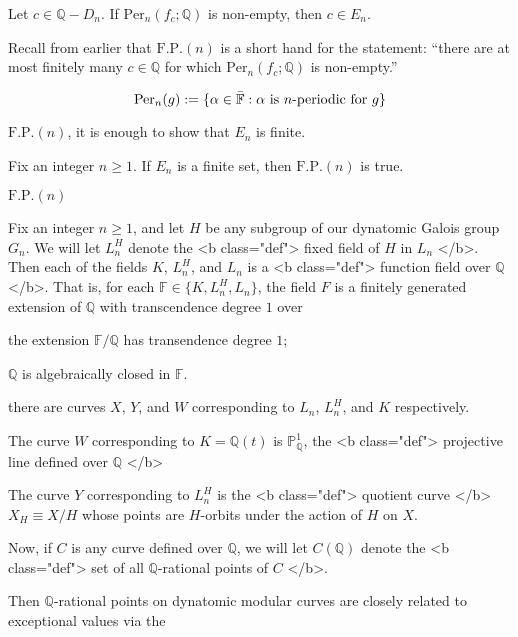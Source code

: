Let \( c \in \mathbb{Q} -D_n \). If \( \mathrm{Per}_{ n } (f_c; \mathbb{ Q } )   \) is non-empty, then \( c \in E_n \). 

Recall from earlier that \(  \mathrm{F.P.}(n)   \) is a short hand for the statement: ``there are at most finitely many \( c \in \mathbb{Q}  \)  for which \( \mathrm{Per}_{ n } (f_c; \mathbb{ Q } )   \) is non-empty.'' 

\[ 
    \mathrm{Per}_{ n } (g) := \{ \alpha \in \bar{\mathbb{F}}  : \text{\( \alpha \) is \( n \)-periodic for \( g \)} \}   
\]

\(  \mathrm{F.P.}(n)   \), it is enough to show that \( E_n \) is finite.

Fix an integer \( n \ge 1 \). If \( E_n \) is a finite set, then \(  \mathrm{F.P.}(n)   \) is true.  

\(  \mathrm{F.P.}(n)   \) 

Fix an integer \( n \ge 1 \), and let \( H \) be any subgroup of our dynatomic Galois group \( G_n \). We will let \( L_n^{H} \) denote the <b class="def"> fixed field of \( H \) in \( L_n \)  </b>. Then each of the fields \( K \), \( L_n^{H}  \), and \( L_n \) is a <b class="def"> function field over \( \mathbb{Q}  \)  </b>. That is, for each \( \mathbb{F}  \in \{K, L_n^{H} , L_n\} \), the field \( F \) is a finitely generated extension of \( \mathbb{Q}  \) with transcendence degree \( 1 \) over     

the extension \( \mathbb{F}  / \mathbb{Q}  \) has transendence degree \( 1 \);  

\( \mathbb{Q}  \) is algebraically closed in \( \mathbb{F}   \). 

there are curves \( X \), \( Y \), and \( W \) corresponding to \( L_n \), \( L_n^{H} \), and \( K \) respectively. 

The curve \( W \) corresponding to \( K = \mathbb{Q} (t)  \) is \( \mathbb{P}  _{\mathbb{Q} } ^{1} \), the <b class="def"> projective line defined over \( \mathbb{Q}  \)  </b>  

The curve \( Y \) corresponding to \( L_n^{H}  \) is the <b class="def"> quotient curve </b> \( X_H \equiv X / H \) whose points are \( H \)-orbits under the action of \( H \) on \( X \). 

Now, if \( C \) is any curve defined over \( \mathbb{Q}  \), we will let \( C(\mathbb{Q} ) \) denote the <b class="def"> set of all \( \mathbb{Q}  \)-rational points of \( C \)  </b>.  

Then \( \mathbb{Q}  \)-rational points on dynatomic modular curves are closely related to exceptional values via the 

